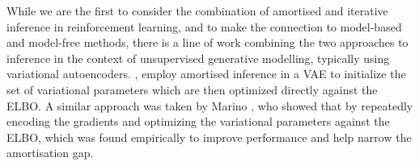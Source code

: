 While we are the first to consider the combination of amortised and iterative inference in reinforcement learning, and to make the connection to model-based and model-free methods, there is a line of work combining the two approaches to inference in the context of unsupervised generative modelling, typically using variational autoencoders. \citep{kim_emi:_2018}, employ amortised inference in a VAE to initialize the set of variational parameters which are then optimized directly against the ELBO. A similar approach was taken by Marino \citep{marino2018iterative}, who showed that by repeatedly encoding the gradients and optimizing the variational parameters against the ELBO, which was found empirically to improve performance and help narrow the amortisation gap.



